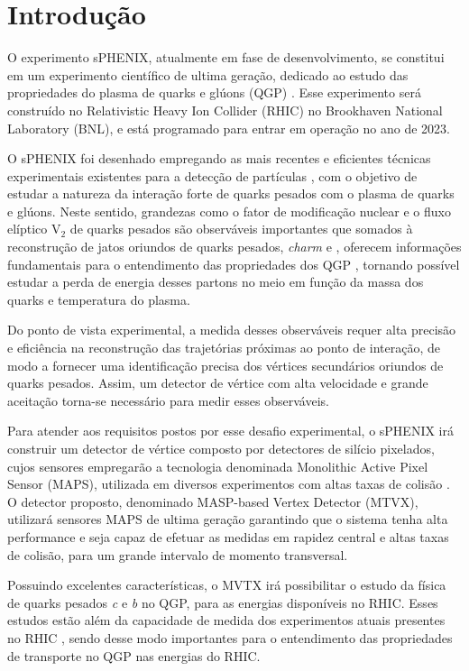 \chapter{Introdução}

O experimento sPHENIX, atualmente em fase de desenvolvimento, se constitui em um experimento científico de ultima geração, dedicado ao estudo das propriedades do plasma de quarks e glúons (QGP) \cite{sPHENIXproposal}. Esse experimento será construído no Relativistic Heavy Ion Collider (RHIC) no Brookhaven National Laboratory (BNL), e está programado para entrar em operação no ano de 2023.

O sPHENIX foi desenhado empregando as mais recentes e eficientes técnicas experimentais existentes para a detecção de partículas \cite{sPHENIXproposal,1}, com o objetivo de estudar a natureza da interação forte de quarks pesados com o plasma de quarks e glúons. Neste sentido, grandezas como o fator de modificação nuclear e o fluxo elíptico V$_{2}$ de quarks pesados são observáveis importantes que somados à reconstrução de jatos oriundos de quarks pesados, \textit{charm} e , oferecem informações fundamentais para o entendimento das propriedades dos QGP \cite{2,3,4,5,6,7}, tornando possível estudar a perda de energia desses partons no meio em função da massa dos quarks e temperatura do plasma.

Do ponto de vista experimental, a medida desses observáveis requer alta precisão e eficiência na reconstrução das trajetórias próximas ao ponto de interação, de modo a fornecer uma identificação precisa dos vértices secundários oriundos de quarks pesados. Assim, um detector de vértice com alta velocidade e grande aceitação torna-se necessário para medir esses observáveis.  

Para atender aos requisitos postos por esse desafio experimental, o sPHENIX irá construir um detector de vértice composto por detectores de silício pixelados, cujos sensores empregarão a tecnologia denominada Monolithic Active Pixel Sensor (MAPS), utilizada em diversos experimentos com altas taxas de colisão \cite{8,9,10}. O detector proposto, denominado MASP-based Vertex Detector (MTVX), utilizará sensores MAPS de ultima geração garantindo que o sistema tenha alta performance e seja capaz de efetuar as medidas em rapidez central e altas taxas de colisão, para um grande intervalo de momento transversal.

Possuindo excelentes características, o MVTX irá possibilitar o estudo da física de quarks pesados \textit{c} e \textit{b} no QGP, para as energias disponíveis no RHIC. Esses estudos estão além da capacidade de medida dos experimentos atuais presentes no RHIC \cite{5,6,7}, sendo desse modo importantes para o entendimento das propriedades de transporte no QGP nas energias do RHIC.


